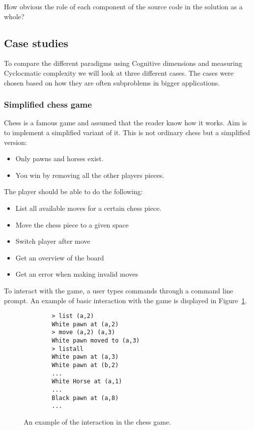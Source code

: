 \documentclass[12pt]{article}
\theoremstyle{definition}
\theoremstyle{theorem}
\begin{document}
How obvious the role of each component of the source code in the solution as a
whole?~\cite{GREEN1996131}

\subsection{Case studies}

To compare the different paradigms using Cognitive dimensions and measuring
Cyclocmatic complexity we will look at three different cases. The cases were
chosen based on how they are often subproblems in bigger applications.

\subsubsection{Simplified chess game}

Chess is a famous game and assumed that the reader know how it works. Aim
is to implement a simplified variant of it. This is not ordinary chess but a
simplified version:

\begin{itemize} 
    \item Only pawns and horses exist.
    \item You win by removing all the other players pieces.
\end{itemize}

The player should be able to do the following:

\begin{itemize} 
    \item List all available moves for a certain chess piece. 
    \item Move the chess piece to a given space
    \item Switch player after move
    \item Get an overview of the board
    \item Get an error when making invalid moves
\end{itemize}

To interact with the game, a user types commands through a command line prompt.
An example of basic interaction with the game is displayed in
Figure~\ref{chessexample}.

\begin{figure}[H]
    \centering
    \begin{lstlisting}
        > list (a,2)
        White pawn at (a,2)
        > move (a,2) (a,3)
        White pawn moved to (a,3)
        > listall
        White pawn at (a,3)
        White pawn at (b,2)
        ...
        White Horse at (a,1)
        ...
        Black pawn at (a,8)
        ...
    \end{lstlisting}
    \label{chessexample}
    \caption{An example of the interaction in the chess game.}
\end{figure}
\end{document}
